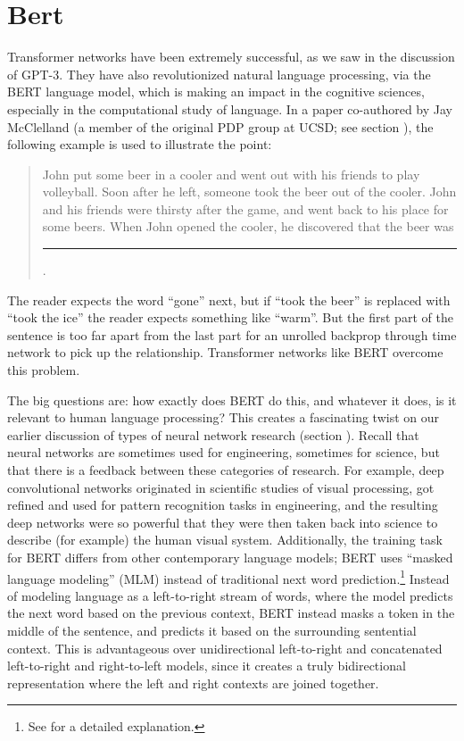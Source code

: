 \section{Bert}

Transformer networks have been extremely successful, as we saw in the discussion of GPT-3. They have also revolutionized natural language processing, via the BERT language model, which is making an impact in the cognitive sciences, especially in the computational study of language. In a paper co-authored by Jay McClelland  \cite{mcclelland2020placing} (a member of the original PDP group at UCSD; see section ), the following example is used to illustrate the point:
\begin{quote}
John put some beer in a cooler and went out with his friends to play volleyball. Soon after he left, someone took the beer out of the cooler. John and his friends were thirsty after the game, and went back to his place for some beers. When John opened the cooler, he discovered that the beer was \rule{1cm}{0.15mm}.
\end{quote}
The reader expects the word ``gone'' next, but if ``took the beer'' is replaced with ``took the ice'' the reader expects something like ``warm''. But the first part of the sentence is too far apart from the last part for an unrolled backprop through time network to pick up the relationship.  Transformer networks like BERT overcome this problem.

The big questions are: how exactly does BERT do this, and whatever it does, is it relevant to human language processing?  This creates a fascinating twist on our earlier discussion of types of neural network research (section ). Recall that neural networks are sometimes used for engineering, sometimes for science, but that there is a feedback between these categories of research. For example, deep convolutional networks originated in scientific studies of visual processing, got refined and used for pattern recognition tasks in engineering, and the resulting deep networks were so powerful that they were then taken back into science  to describe (for example) the human visual system.
Additionally, the training task for BERT differs from other contemporary language models; BERT uses ``masked language modeling'' (MLM) instead of traditional next word prediction.\footnote{See \cite{devlin2018bert} for a detailed explanation.} Instead of modeling language as a left-to-right stream of words, where the model predicts the next word based on the previous context, BERT instead masks a token in the middle of the sentence, and predicts it based on the surrounding sentential context. This is advantageous over unidirectional left-to-right and concatenated left-to-right and right-to-left models, since it creates a truly bidirectional representation where the left and right contexts are joined together.

